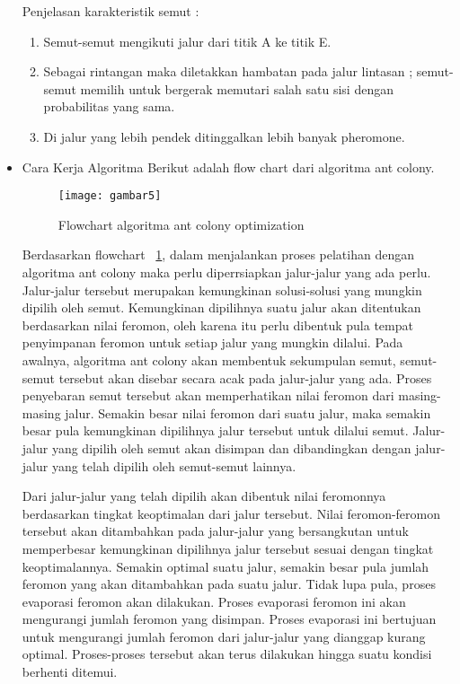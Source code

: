 \begin{itemize}
Penjelasan karakteristik semut :
\begin{enumerate}
	\item Semut-semut mengikuti jalur dari titik A ke titik E.
	\item Sebagai rintangan maka diletakkan hambatan pada jalur lintasan ; semut-semut memilih untuk bergerak memutari salah satu sisi dengan probabilitas yang sama.
	\item Di jalur yang lebih pendek ditinggalkan lebih banyak pheromone.\\	
\end{enumerate}

\item Cara Kerja Algoritma
Berikut adalah flow chart dari algoritma ant colony.
\begin{figure}[H]
	\centering
	\texttt{[image: gambar5]}
	\caption[Flowchart ACO] {Flowchart algoritma ant colony optimization}
	\label{fig:flowchartACO}
\end{figure}
Berdasarkan flowchart ~\ref{fig:flowchartACO}, dalam menjalankan proses pelatihan dengan algoritma ant colony maka perlu diperrsiapkan
jalur-jalur yang ada perlu. Jalur-jalur tersebut merupakan kemungkinan
solusi-solusi yang mungkin dipilih oleh semut. Kemungkinan dipilihnya suatu jalur akan ditentukan
berdasarkan nilai feromon, oleh karena itu perlu dibentuk pula tempat penyimpanan feromon untuk
setiap jalur yang mungkin dilalui.
Pada awalnya, algoritma ant colony akan membentuk sekumpulan semut, semut-semut tersebut
akan disebar secara acak pada jalur-jalur yang ada. Proses penyebaran semut tersebut akan memperhatikan
nilai feromon dari masing-masing jalur. Semakin besar nilai feromon dari suatu jalur,
maka semakin besar pula kemungkinan dipilihnya jalur tersebut untuk dilalui semut. Jalur-jalur
yang dipilih oleh semut akan disimpan dan dibandingkan dengan jalur-jalur yang telah dipilih oleh
semut-semut lainnya.

Dari jalur-jalur yang telah dipilih akan dibentuk nilai feromonnya berdasarkan tingkat keoptimalan
dari jalur tersebut. Nilai feromon-feromon tersebut akan ditambahkan pada jalur-jalur
yang bersangkutan untuk memperbesar kemungkinan dipilihnya jalur tersebut sesuai dengan tingkat
keoptimalannya. Semakin optimal suatu jalur, semakin besar pula jumlah feromon yang akan
ditambahkan pada suatu jalur.
Tidak lupa pula, proses evaporasi feromon akan dilakukan. Proses evaporasi feromon ini akan
mengurangi jumlah feromon yang disimpan. Proses evaporasi ini bertujuan untuk mengurangi
jumlah feromon dari jalur-jalur yang dianggap kurang optimal. Proses-proses tersebut akan terus
dilakukan hingga suatu kondisi berhenti ditemui.


\end{itemize}
